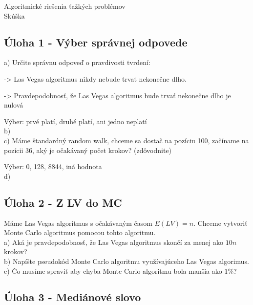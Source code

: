 \documentclass[a4paper]{article}
\begin{document}
 
	
\pagestyle{plain}

\begin{center}
	\sc\large
	Algoritmické riešenia ťažkých problémov\\
	Skúška
\end{center}

\subsection*{Úloha 1 - Výber správnej odpovede}

a) Určite správnu odpoveď o pravdivosti tvrdení:

-> Las Vegas algoritmus nikdy nebude trvať nekonečne dlho.

-> Pravdepodobnosť, že Las Vegas algoritmus bude trvať nekonečne dlho je nulová

Výber: prvé platí, druhé platí, ani jedno neplatí
\\

b)
\\

c) Máme štandardný random walk, chceme sa dostač na pozíciu 100, začíname na pozícii 36, aký je očakávaný počet krokov? (zdôvodnite)

Výber: 0, 128, 8844, iná hodnota
\\

d) 

\subsection*{Úloha 2 - Z LV do MC}

Máme Las Vegas algoritmus s očakávaným časom $E(LV)=n$. Chceme vytvoriť Monte Carlo algoritmus pomocou tohto algoritmu.
\\

a) Aká je pravdepodobnosť, že Las Vegas algoritmus skončí za menej ako $10n$ krokov?
\\

b) Napíšte pseudokód Monte Carlo algoritmu využívajúceho Las Vegas algorimus.
\\

c) Čo musíme spraviť aby chyba Monte Carlo algoritmu bola manšia ako $1\%$?

\subsection*{Úloha 3 - Mediánové slovo}
\end{document}
